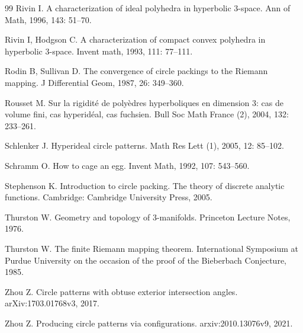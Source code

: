\documentclass[12pt]{amsart}
\numberwithin{equation}{section}
\begin{document}
\begin{thebibliography}{99}
 Rivin I. A characterization of ideal polyhedra in hyperbolic 3-space. Ann of Math, 1996, 143: 51--70.

 Rivin I, Hodgson C. A characterization of compact convex polyhedra in hyperbolic 3-space. Invent math, 1993, 111: 77--111.

 Rodin B, Sullivan D. The convergence of circle packings to the Riemann mapping. J Differential Geom, 1987, 26: 349--360.

 Rousset M. Sur la rigidit\'e de poly\`edres hyperboliques en dimension 3: cas de volume fini, cas hyperid\'eal, cas fuchsien. Bull Soc Math France (2), 2004, 132: 233--261.

 Schlenker J. Hyperideal circle patterns. Math Res Lett (1), 2005, 12: 85--102.

 Schramm O. How to cage an egg. Invent Math, 1992, 107: 543--560.

 Stephenson K. Introduction to circle packing. The theory of discrete analytic functions. Cambridge: Cambridge University Press, 2005.

 Thurston W. Geometry and topology of 3-manifolds. Princeton Lecture Notes, 1976.

 Thurston W. The finite Riemann mapping theorem. International Symposium at Purdue University on the occasion of the proof of the Bieberbach Conjecture, 1985.

 Zhou Z. Circle patterns with obtuse exterior intersection angles. arXiv:1703.01768v3, 2017.

 Zhou Z. Producing circle patterns via configurations. arxiv:2010.13076v9, 2021.

\end{thebibliography}
\end{document}
